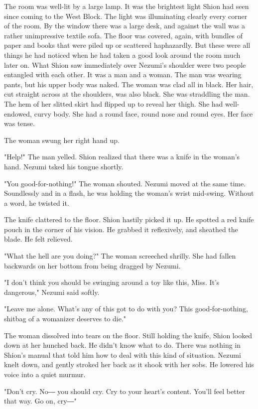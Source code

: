 The room was well-lit by a large lamp. It was the brightest light Shion
had seen since coming to the West Block. The light was illuminating
clearly every corner of the room. By the window there was a large desk,
and against the wall was a rather unimpressive textile sofa. The floor
was covered, again, with bundles of paper and books that were piled up
or scattered haphazardly. But these were all things he had noticed when
he had taken a good look around the room much later on. What Shion saw
immediately over Nezumi's shoulder were two people entangled with each
other. It was a man and a woman. The man was wearing pants, but his
upper body was naked. The woman was clad all in black. Her hair, cut
straight across at the shoulders, was also black. She was straddling the
man. The hem of her slitted skirt had flipped up to reveal her thigh.
She had well-endowed, curvy body. She had a round face, round nose and
round eyes. Her face was tense.

The woman swung her right hand up.

"Help!" The man yelled. Shion realized that there was a knife in the
woman's hand. Nezumi tsked his tongue shortly.

"You good-for-nothing!" The woman shouted. Nezumi moved at the same
time. Soundlessly and in a flash, he was holding the woman's wrist
mid-swing. Without a word, he twisted it.

The knife clattered to the floor. Shion hastily picked it up. He spotted
a red knife pouch in the corner of his vision. He grabbed it
reflexively, and sheathed the blade. He felt relieved.

"What the hell are you doing?" The woman screeched shrilly. She had
fallen backwards on her bottom from being dragged by Nezumi.

"I don't think you should be swinging around a toy like this, Miss. It's
dangerous," Nezumi said softly.

"Leave me alone. What's any of this got to do with you? This
good-for-nothing, shitbag of a womanizer deserves to die."

The woman dissolved into tears on the floor. Still holding the knife,
Shion looked down at her hunched back. He didn't know what to do. There
was nothing in Shion's manual that told him how to deal with this kind
of situation. Nezumi knelt down, and gently stroked her back as it shook
with her sobs. He lowered his voice into a quiet murmur.

"Don't cry. No― you should cry. Cry to your heart's content. You'll feel
better that way. Go on, cry―"

